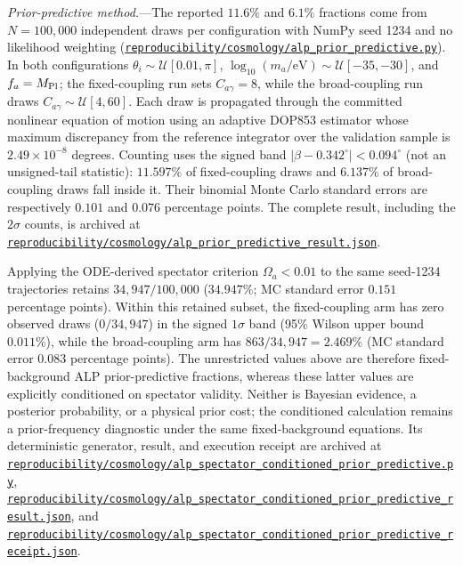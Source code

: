 \documentclass[aps,prd,twocolumn,superscriptaddress,showpacs,preprintnumbers,nofootinbib,longbibliography,floatfix]{revtex4-2}
\newcommand{\repoBase}{https://github.com/Hubify-Projects/bigbounce/blob/main}
\newcommand{\artifact}[1]{\href{\repoBase/#1}{\nolinkurl{#1}}}
\begin{document}
\textit{Prior-predictive method.}---The reported $11.6\%$ and $6.1\%$
fractions come from $N=100{,}000$ independent draws per configuration with
NumPy seed 1234 and no likelihood weighting
(\artifact{reproducibility/cosmology/alp_prior_predictive.py}). In both
configurations $\theta_i\sim\mathcal U[0.01,\pi]$,
$\log_{10}(m_a/\mathrm{eV})\sim\mathcal U[-35,-30]$, and $f_a=M_{\rm Pl}$;
the fixed-coupling run sets $C_{a\gamma}=8$, while the broad-coupling run
draws $C_{a\gamma}\sim\mathcal U[4,60]$. Each draw is propagated through the
committed nonlinear equation of motion using an adaptive DOP853 estimator
whose maximum discrepancy from the reference integrator over the validation
sample is $2.49\times10^{-8}$ degrees. Counting uses the signed band
$|\beta-0.342^\circ|<0.094^\circ$ (not an unsigned-tail statistic):
$11.597\%$ of fixed-coupling draws and $6.137\%$ of broad-coupling draws
fall inside it. Their binomial Monte Carlo standard errors are respectively
$0.101$ and $0.076$ percentage points. The complete result, including the
$2\sigma$ counts, is archived at
\artifact{reproducibility/cosmology/alp_prior_predictive_result.json}.

Applying the ODE-derived spectator criterion $\Omega_a<0.01$ to the same
seed-1234 trajectories retains $34{,}947/100{,}000$
($34.947\%$; MC standard error $0.151$ percentage points). Within this retained subset, the
fixed-coupling arm has zero observed draws ($0/34{,}947$) in the signed $1\sigma$ band
(95\% Wilson upper bound $0.011\%$), while the broad-coupling arm has
$863/34{,}947=2.469\%$ (MC standard error $0.083$ percentage points). The unrestricted values
above are therefore fixed-background ALP prior-predictive fractions, whereas
these latter values are explicitly conditioned on spectator validity. Neither
is Bayesian evidence, a posterior probability, or a physical prior cost; the
conditioned calculation remains a prior-frequency diagnostic under the same
fixed-background equations. Its deterministic generator, result, and
execution receipt are archived at
\artifact{reproducibility/cosmology/alp_spectator_conditioned_prior_predictive.py},
\artifact{reproducibility/cosmology/alp_spectator_conditioned_prior_predictive_result.json},
and
\artifact{reproducibility/cosmology/alp_spectator_conditioned_prior_predictive_receipt.json}.
\end{document}
